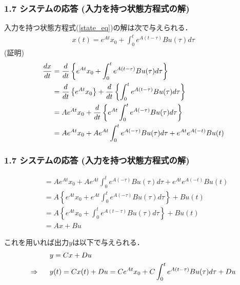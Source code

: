 \begin{frame}[t]
\frametitle{1.7 システムの応答 (入力を持つ状態方程式の解)}
入力を持つ状態方程式(\ref{state_eq})の解は次で与えられる．
\begin{align}
  x(t) = e^{At} x_0 + \int_0^t e^{A(t-\tau)} B u (\tau) d \tau
  \label{response_w_input}
\end{align}
(証明)
\begin{align}
  \frac{dx}{dt}
  &=\frac{d}{dt} \left\{ e^{At} x_0 + \int_0^t e^{A(t-\tau)} B u (\tau) d \tau \right\}
\nonumber \\
  &=\frac{d}{dt} \left\{ e^{At} x_0 \right\}
    +\frac{d}{dt} \left\{ \int_0^t e^{A(t-\tau)} B u (\tau) d \tau \right\}
\nonumber\\
  &= A e^{At} x_0 + \frac {d}{dt} \left\{ e^{At} \int_0^t e^{A(-\tau)} B u (\tau) d \tau \right\}
\nonumber\\
  &= A e^{At} x_0 +  A e^{At} \int_0^t e^{A(-\tau)} B u (\tau) d \tau
        + e^{At}  e^{A(-t)} B u (t)\notag
\end{align}
\end{frame}


\begin{frame}[t]
\frametitle{1.7 システムの応答 (入力を持つ状態方程式の解)}
\vspace*{-5mm}

\begin{align}
  &= A e^{At} x_0 +  A e^{At} \int_0^t e^{A(-\tau)} B u (\tau) d \tau
        + e^{At}  e^{A(-t)} B u (t)
\nonumber\\
  &= A \left\{ e^{At} x_0 +  e^{At} \int_0^t e^{A(-\tau)} B u (\tau) d \tau \right\}
        +  B u (t)
\nonumber \\
  &= A \left\{ e^{At} x_0 +  \int_0^t e^{A(t-\tau)} B u (\tau) d \tau \right\}
        +  B u (t)
\nonumber\\
  & = Ax + Bu
\end{align}

これを用いれば出力$y$は以下で与えられる．
\begin{align}
  &y = Cx + Du \notag \\
  \Rightarrow \ \ \ \ \ &y(t)= Cx(t)+Du = Ce^{At} x_0 + C\int_0^t e^{A(t-\tau)} B u (\tau) d \tau + Du
\label{eq:outputresponse}
\end{align}
\end{frame}


